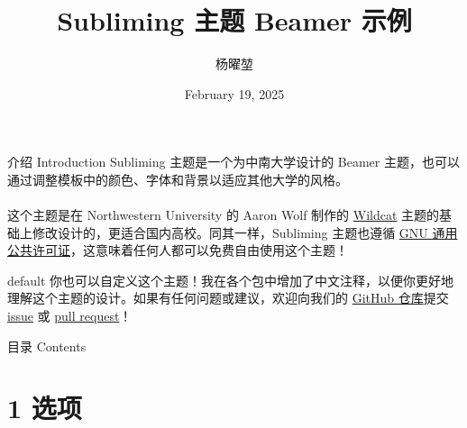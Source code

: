 \documentclass[10pt,aspectratio=169,fontset=none]{ctexbeamer}
\title{Subliming 主题 Beamer 示例}
\author{杨曜堃}
\institute{地球科学与信息物理学院}
\date{February 19, 2025}
\begin{document}
    \begin{frame}
        \titlepage
    \end{frame}

    \begin{frame}{介绍 Introduction}
        Subliming 主题是一个为中南大学设计的 Beamer 主题，也可以通过调整模板中的颜色、字体和背景以适应其他大学的风格。 
        \\ ~ \\
        这个主题是在 Northwestern University 的 Aaron Wolf 制作的 \href{https://github.com/aarondwolf/wildcatwildcat}{Wildcat} 主题的基础上修改设计的，更适合国内高校。同其一样，Subliming 主题也遵循 \href{http://www.gnu.org/licenses/}{GNU 通用公共许可证}，这意味着任何人都可以免费自由使用这个主题！
        
        \begin{tbox}{default}
            你也可以自定义这个主题！我在各个包中增加了中文注释，以便你更好地理解这个主题的设计。如果有任何问题或建议，欢迎向我们的 \href{https://github.com/PourRevenir/Subliming}{GitHub 仓库}提交 \href{https://github.com/PourRevenir/Subliming/issues}{issue} 或 \href{https://github.com/PourRevenir/Subliming/pulls}{pull request}！
        \end{tbox}
    \end{frame}

    \begin{frame}{目录 Contents}
        \tableofcontents
    \end{frame}

    \section{1 选项}
\end{document}
